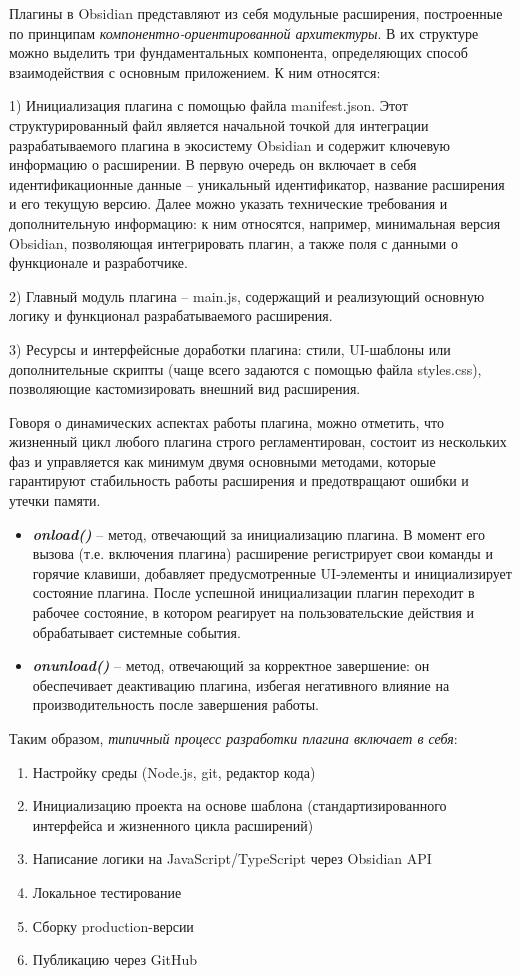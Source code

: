 \documentclass[14pt]{extarticle}
\begin{document}
	Плагины в Obsidian представляют из себя модульные расширения, построенные по принципам \textit{компонентно-ориентированной архитектуры}. В их структуре можно выделить три фундаментальных компонента, определяющих способ взаимодействия с основным приложением. К ним относятся:
	
	1) Инициализация плагина с помощью файла manifest.json. Этот структурированный файл является начальной точкой для интеграции разрабатываемого плагина в экосистему Obsidian и содержит ключевую информацию о расширении. В первую очередь он включает в себя идентификационные данные – уникальный идентификатор, название расширения и его текущую версию. Далее можно указать технические требования и дополнительную информацию: к ним относятся, например, минимальная версия Obsidian, позволяющая интегрировать плагин, а также поля с данными о функционале и разработчике. 
	
	2)  Главный модуль плагина – main.js, содержащий и реализующий основную логику и функционал разрабатываемого расширения.
	
	3) Ресурсы и интерфейсные доработки плагина: стили, UI-шаблоны или дополнительные скрипты (чаще всего задаются с помощью файла styles.css), позволяющие кастомизировать внешний вид расширения.
	\vspace{1em}
	
	Говоря о динамических аспектах работы плагина, можно отметить, что жизненный цикл любого плагина строго регламентирован, состоит из нескольких фаз и управляется как минимум двумя основными методами, которые гарантируют стабильность работы расширения и предотвращают ошибки и утечки памяти.
	\begin{itemize}
		\item \textit{\textbf{onload()}} – метод, отвечающий за инициализацию плагина. В момент его вызова (т.е. включения плагина)  расширение регистрирует свои команды и горячие клавиши, добавляет предусмотренные UI-элементы и инициализирует состояние плагина. После успешной инициализации плагин переходит в рабочее состояние, в котором реагирует на пользовательские действия и обрабатывает системные события.
		\item \textbf{\textit{onunload()}} – метод, отвечающий за корректное завершение: он обеспечивает деактивацию плагина, избегая негативного влияние на производительность после завершения работы. 
	\end{itemize}
	\vspace{1em}
	
	Таким образом,\textit{ типичный процесс разработки плагина включает в себя}:
	\begin{enumerate}
		\item Настройку среды (Node.js, git, редактор кода)
		\item Инициализацию проекта на основе шаблона (стандартизированного интерфейса и жизненного цикла расширений)
		\item Написание логики на JavaScript/TypeScript через Obsidian API
		\item Локальное тестирование
		\item Сборку production-версии
		\item Публикацию через GitHub
	\end{enumerate}
	
\end{document}
